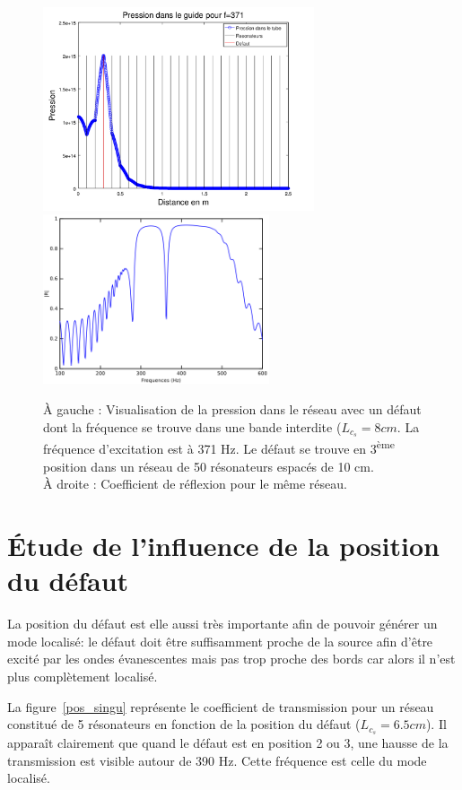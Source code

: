 \begin{figure}[!h]
\centering
\includegraphics[height=6cm]{images_chp2/visu_pression_favo2.png}
\includegraphics[height=5cm]{images_chp2/reflexion_50HR16_pos3_8cm.png}
\caption{\label{defaut_dansb} À gauche : Visualisation de la pression dans le réseau avec un défaut dont la fréquence se trouve dans une bande interdite ($L_{c_{s}}=8cm$. La fréquence d'excitation est à 371 Hz. Le défaut se trouve en 3\textsuperscript{ème} position dans un réseau de 50 résonateurs espacés de 10 cm.\\ À droite : Coefficient de réflexion pour le même réseau.}
\end{figure}


\section{Étude de l'influence de la position du défaut}
La position du défaut est elle aussi très importante afin de pouvoir générer un mode localisé: le défaut doit être suffisamment proche de la source afin d'être excité par les ondes évanescentes mais pas trop proche des bords car alors il n'est plus complètement localisé.

La figure~\ref{pos_singu} représente le coefficient de transmission pour un réseau constitué de 5 résonateurs en fonction de la position du défaut ($L_{c_{s}}=6.5 cm$). Il apparaît clairement que quand le défaut est en position 2 ou 3, une hausse de la transmission est visible autour de 390 Hz. Cette fréquence est celle du mode localisé. 

